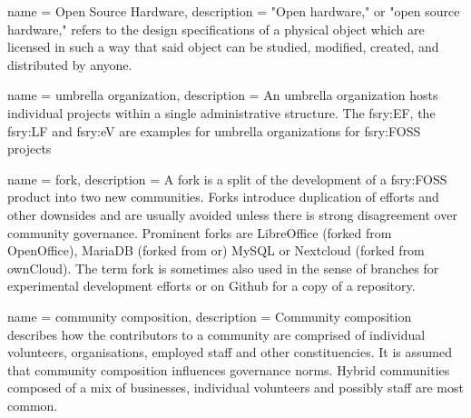 
 { name = {Open Source Hardware}, description = {
    "Open hardware," or "open source hardware," refers to the design
    specifications of a physical object which are licensed in such a way
    that said object can be studied, modified, created, and distributed by
    anyone.\cite{fsry:open-hardware} } }


 { name = {umbrella organization},
  description = {An umbrella organization hosts individual projects
    within a single administrative structure. The \gls{fsry:EF}, the
    \gls{fsry:LF} and \gls{fsry:eV} are examples for umbrella organizations for
    \gls{fsry:FOSS} projects} }

 { name = {fork}, description = {A fork is
    a split of the development of a \gls{fsry:FOSS} product into two
    new communities. Forks introduce duplication of efforts and other
    downsides and are usually avoided unless there is strong
    disagreement over community governance. Prominent forks are
    LibreOffice (forked from OpenOffice), MariaDB (forked from or)
    MySQL or Nextcloud (forked from ownCloud). The term fork is
    sometimes also used in the sense of branches for experimental
    development efforts or on Github for a copy of a repository.} }

 { name = {community composition},
  description = {Community composition describes how the contributors
    to a community are comprised of individual volunteers,
    organisations, employed staff and other constituencies. It is
    assumed that community composition influences governance
    norms. Hybrid communities composed of a mix of businesses,
    individual volunteers and possibly staff are most common. } }

